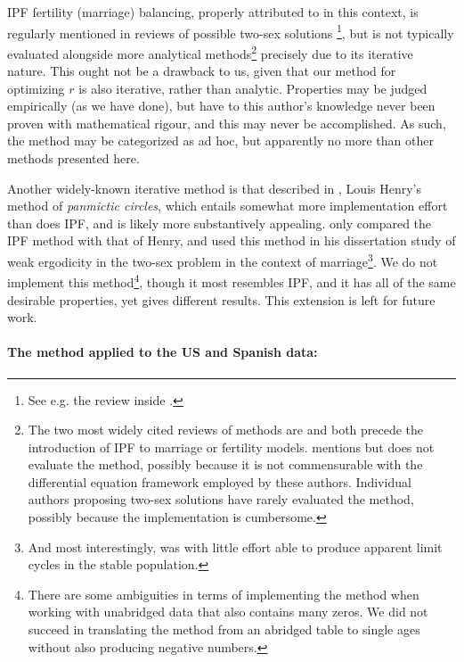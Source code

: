 IPF fertility (marriage) balancing, properly attributed to \citet{mc1975models}
in this context, is regularly mentioned in reviews of possible two-sex solutions \footnote{See e.g.
the review inside \citet{ianelli2005gender}.}, but is not typically
evaluated alongside more analytical
methods\footnote{The two most widely cited
reviews of methods are \citet{keyfitz1972mathematics} and
\citet{pollard1973mathematical} both precede the introduction of IPF to
marriage or fertility models. \citet{ianelli2005gender} mentions but does not
evaluate the method, possibly because it is not commensurable with the
differential equation framework employed by these authors. Individual authors proposing
two-sex solutions have rarely evaluated the method, possibly because the implementation
is cumbersome.} precisely due to its iterative nature. This ought not be a
drawback to us, given that our method for optimizing $r$ is also iterative,
rather than analytic. Properties may be judged empirically (as we have done),
but have to this author's knowledge never been proven with mathematical rigour,
and this may never be accomplished. As such, the method may be categorized as ad
hoc, but apparently no more than other methods presented here.

Another widely-known iterative method is that described in
\citet{henry1972nuptiality}, Louis Henry's method of \textit{panmictic circles},
which entails somewhat more implementation effort than does IPF, and is
likely more substantively appealing. \citet{mc1975models} only compared the
IPF method with that of Henry, and \citet{wijewickrema1980weak} used this method 
in his dissertation study of weak ergodicity in the two-sex problem in the
context of marriage\footnote{And most interestingly, was with little
effort able to produce apparent limit cycles in the stable population.}. We do
not implement this method\footnote{There are some ambiguities in terms of implementing the method when working with unabridged data that also contains many zeros. We did not succeed in translating the method from an
abridged table to single ages without also producing negative numbers.}, though
it most resembles IPF, and it has all of the same desirable properties, yet
gives different results. This extension is left for future work.

\paragraph{The method applied to the US and Spanish data:}

